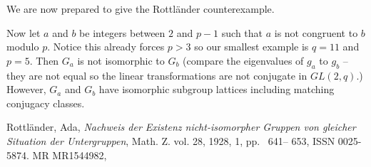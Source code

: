 \documentclass[12pt]{article}
\begin{document}
We are now prepared to give the Rottl\"ander counterexample.

Now let $a$ and $b$ be integers between $2$ and $p-1$ such that $a$ is not congruent to $b$ modulo $p$.  Notice this already forces $p>3$ so our smallest example is $q=11$ and $p=5$.  Then $G_a$ is not isomorphic to $G_b$  (compare the eigenvalues of $g_a$ to $g_b$ -- they are not equal so the linear transformations are not conjugate in $GL(2,q)$.)  However, $G_a$ and $G_b$ have isomorphic subgroup lattices including matching conjugacy classes.



\providecommand{\bysame}{\leavevmode\hbox to3em{\hrulefill}\thinspace}
\providecommand{\MR}{\relax\ifhmode\unskip\space\fi MR }
\providecommand{\MRhref}[2]{%
  \href{http://www.ams.org/mathscinet-getitem?mr=#1}{#2}
}
\providecommand{\href}[2]{#2}
\begin{thebibliography}{10}

Rottl\"ander, Ada,
\emph{Nachweis der Existenz nicht-isomorpher Gruppen von gleicher
            Situation der Untergruppen},
Math. Z. vol. 28, 1928, 1, pp.~ 641-- 653, ISSN 0025-5874.
    \MR{MR1544982},

\end{thebibliography}
\end{document}
